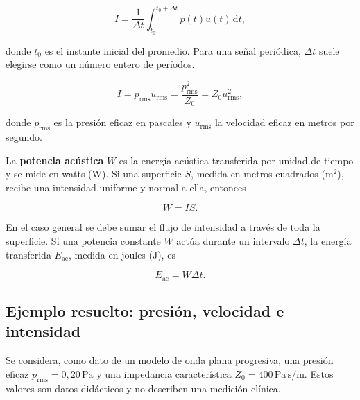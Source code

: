 \begin{equation}
    I=\frac{1}{\Delta t}
      \int_{t_0}^{t_0+\Delta t}p(t)u(t)\,\mathrm{d}t,
    \label{eq:u4-intensidad-media}
\end{equation}

donde \(t_0\) es el instante inicial del promedio. Para una señal periódica,
\(\Delta t\) suele elegirse como un número entero de períodos.


\begin{equation}
    I=p_\mathrm{rms}u_\mathrm{rms}
     =\frac{p_\mathrm{rms}^2}{Z_0}
     =Z_0u_\mathrm{rms}^2,
    \label{eq:u4-intensidad-onda-plana}
\end{equation}

donde \(p_\mathrm{rms}\) es la presión eficaz en pascales y
\(u_\mathrm{rms}\) la velocidad eficaz en metros por segundo.

La \textbf{potencia acústica} \(W\) es la energía acústica transferida por
unidad de tiempo y se mide en watts (\(\text{W}\)). Si una superficie \(S\),
medida en metros cuadrados (\(\text{m}^2\)), recibe una intensidad uniforme y
normal a ella, entonces

\begin{equation}
    W=IS.
    \label{eq:u4-potencia-uniforme}
\end{equation}

En el caso general se debe sumar el flujo de intensidad a través de toda la
superficie. Si una potencia constante \(W\) actúa durante un intervalo
\(\Delta t\), la energía transferida \(E_\mathrm{ac}\), medida en joules
(\(\text{J}\)), es

\begin{equation}
    E_\mathrm{ac}=W\Delta t.
    \label{eq:u4-energia-acustica}
\end{equation}

\subsection{Ejemplo resuelto: presión, velocidad e intensidad}
\label{sec:u4-ejemplo-magnitudes}

Se considera, como dato de un modelo de onda plana progresiva, una presión
eficaz \(p_\mathrm{rms}=0{,}20\,\text{Pa}\) y una impedancia característica
\(Z_0=400\,\text{Pa}\,\text{s}/\text{m}\). Estos valores son datos
didácticos y no describen una medición clínica.

